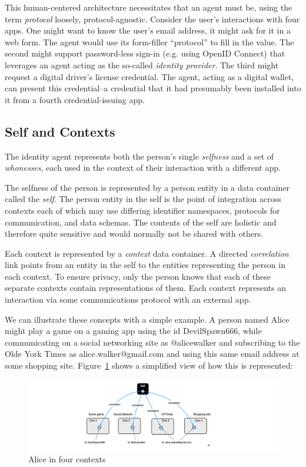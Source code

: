 \documentclass[11pt, oneside]{article}   	%
\begin{document}
This human-centered architecture necessitates that an agent must be, using the term \emph{protocol} loosely, protocol-agnostic. Consider the user's interactions with four apps. One might want to know the user's email address, it might ask for it in a web form. The agent would use its form-filler ``protocol'' to fill in the value. The second might support password-less sign-in (e.g. using OpenID Connect) that leverages an agent acting as the so-called \emph{identity provider}. The third might request a digital driver's license credential. The agent, acting as a digital wallet, can present this credential--a credential that it had presumably been installed into it from a fourth credential-issuing app. 

\subsection{Self and Contexts}

The identity agent represents both the person's single \emph{selfness} and a set of \emph{whonesses}, each used in the context of their interaction with a different app.

The selfness of the person is represented by a person entity in a data container called the \emph{self}. The person entity in the self is the point of integration across contexts each of which may use differing identifier namespaces, protocols for communication, and data schemas. The contents of the self are holistic and therefore quite sensitive and would normally not be shared with others. 

Each context is represented by a \emph{context} data container. A directed \emph{correlation} link points from an entity in the self to the entities representing the person in each context. To ensure privacy, only the person knows that each of these separate contexts contain representations of them. Each context represents an interaction via some communications protocol with an external app. 

We can illustrate these concepts with a simple example. A person named Alice might play a game on a gaming app using the id DevilSpawn666, while communicating on a social networking site as @alicewalker and subscribing to the Olde York Times as alice.walker@gmail.com and using this same email address at some shopping site. Figure~\ref{fig:three-contexts} shows a simplified view of how this is represented:

\begin{figure}[htbp]
\includegraphics[width=\textwidth]{./images/example1.png}
\caption{Alice in four contexts}
\label{fig:three-contexts}
\end{figure}
\end{document}
